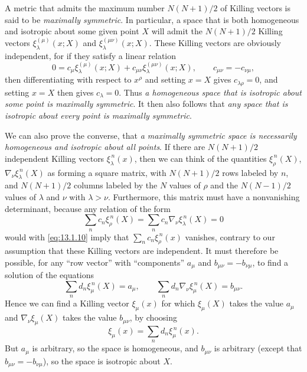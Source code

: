 A metric that admits the maximum number \(N(N+1)/2\) of Killing vectors is
said to be \emph{maximally symmetric}. In particular, a space that is both
homogeneous and isotropic about some given point \(X\) will admit the
\(N(N+1)/2\) Killing vectors \(\xi_\lambda^{(\mu)}(x;X)\) and
\(\xi_\lambda^{(\mu\nu)}(x;X)\). These Killing vectors are obviously
independent, for if they satisfy a linear relation
\[
  0
  =
  c_\mu\xi_\lambda^{(\mu)}(x;X)
  +c_{\mu\nu}\xi_\lambda^{(\mu\nu)}(x;X),
  \qquad
  c_{\mu\nu}=-c_{\nu\mu},
\]
then differentiating with respect to \(x^\rho\) and setting \(x=X\) gives
\(c_{\lambda\rho}=0\), and setting \(x=X\) then gives \(c_\lambda=0\).
Thus \emph{a homogeneous space that is isotropic about some point is
maximally symmetric}. It then also follows that \emph{any space that is
isotropic about every point is maximally symmetric}.

We can also prove the converse, that \emph{a maximally symmetric space is
necessarily homogeneous and isotropic about all points}. If there are
\(N(N+1)/2\) independent Killing vectors \(\xi_\lambda^{\,n}(x)\), then
we can think of the quantities \(\xi_\rho^{\,n}(X)\),
\(\nabla_\nu\xi_\lambda^{\,n}(X)\) as forming a square matrix, with
\(N(N+1)/2\) rows labeled by \(n\), and \(N(N+1)/2\) columns labeled by
the \(N\) values of \(\rho\) and the \(N(N-1)/2\) values of \(\lambda\)
and \(\nu\) with \(\lambda>\nu\). Furthermore, this matrix must have a
nonvanishing determinant, because any relation of the form
\[
  \sum_n c_n\xi_\rho^{\,n}(X)
  =
  \sum_n c_n\nabla_\nu\xi_\lambda^{\,n}(X)
  =0
\]
would with \eqref{eq:13.1.10} imply that
\(\sum_n c_n\xi_\rho^{\,n}(x)\) vanishes, contrary to our assumption that
these Killing vectors are independent. It must therefore be possible, for any
``row vector'' with ``components'' \(a_\mu\) and
\(b_{\mu\nu}=-b_{\nu\mu}\), to find a solution of the equations
\[
  \sum_n d_n\xi_\mu^{\,n}(X)=a_\mu,
  \qquad
  \sum_n d_n\nabla_\nu\xi_\mu^{\,n}(X)=b_{\mu\nu}.
\]
Hence we can find a Killing vector \(\xi_\mu(x)\) for which
\(\xi_\mu(X)\) takes the value \(a_\mu\) and
\(\nabla_\nu\xi_\mu(X)\) takes the value \(b_{\mu\nu}\), by choosing
\[
  \xi_\mu(x)=\sum_n d_n\xi_\mu^{\,n}(x).
\]
But \(a_\mu\) is arbitrary, so the space is homogeneous, and \(b_{\mu\nu}\)
is arbitrary (except that \(b_{\mu\nu}=-b_{\nu\mu}\)), so the space is
isotropic about \(X\).

